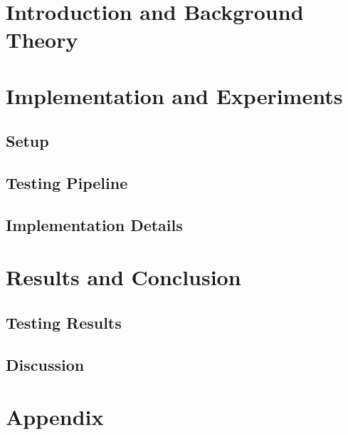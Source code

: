 
\addtolength{\evensidemargin}{-12mm}

%
%
\part{Introduction and Background Theory}
\label{part:introAndBackgroundTheory}





%
\part{Implementation and Experiments}
\label{part:experimentsAndResults}
\chapter{Setup}
\chapter{Testing Pipeline}
\chapter{Implementation Details}

\part[Results and Conclusion]{Results and Conclusion}
\label{part:resultsAndConclusion}
\chapter{Testing Results}
\chapter{Discussion}

%
%

\part*{Appendix}

\appendix %

%
